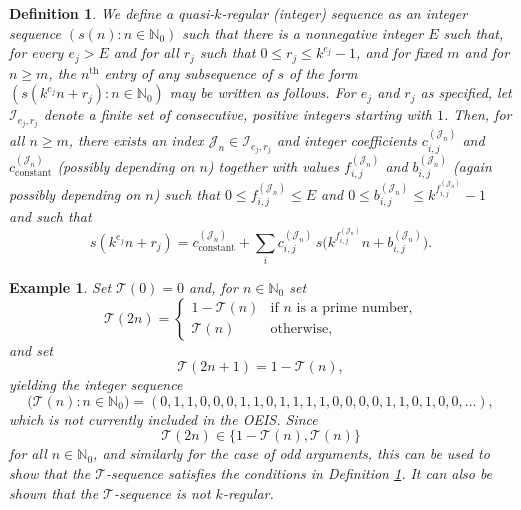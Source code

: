 \documentclass[12pt]{article}
\newtheorem{definition}{Definition}
\newtheorem{example}{Example}
\begin{document}
\begin{definition}\label{definitionquasi}
 We define a \emph{quasi-$k$-regular (integer) sequence}  as an integer sequence $(s(n) : n \in \mathbb{N}_{0} )$ such that there is a 
 nonnegative integer $E$ such that,  for every $e_j > E$ and for all $r_j$ such that $0 \leq r_j \leq k^{e_j} - 1$, and for fixed $m$ and 
 for $n \geq m$, the $n^{\text{th}}$ entry  of any subsequence of $s$ of the form $(s(k^{e_j} n + r_j ) : n \in \mathbb{N}_{0} )$ may be 
 written as follows. For $e_j$ and $r_j$ as specified,  let $\mathcal{I}_{e_j, r_j}$ denote a finite set of consecutive, positive integers 
 starting with $1$.  Then, for all $n \geq m$, there exists an index $\mathcal{J}_{n} \in \mathcal{I}_{e_j, r_j}$  and integer coefficients $c_{i, 
  j}^{\left( \mathcal{J}_{n} \right)}$ and  $c_{\text{constant}}^{\left( \mathcal{J}_{n} \right)}$ (possibly depending on $n$)  together with 
 values $f_{i, j}^{\left( \mathcal{J}_{n} \right)} $ and $ b_{i, j}^{\left( \mathcal{J}_{n}  \right)} $ (again possibly depending on $n$) such that 
 $0 \leq f_{i, j}^{\left( \mathcal{J}_{n} \right)} \leq E$ and $0 \leq b_{i, j}^{\left( \mathcal{J}_{n} \right)} \leq k^{f_{i, j}^{\left( \mathcal{J}_{n} 
 \right)}} - 1$ and such that 
\begin{equation*}
 s(k^{e_j} n + r_j ) = c_{\text{constant}}^{\left( \mathcal{J}_{n} \right)}
 + \sum_{i} c_{i, j}^{\left( \mathcal{J}_{n} \right) } \, s\big( k^{f_{i, j}^{\left( \mathcal{J}_{n} \right)}} n 
 + b_{i, j}^{\left( \mathcal{J}_{n} \right)} \big). 
\end{equation*}
\end{definition}

\begin{example}\label{exmathcalT}
 Set $\mathcal{T}(0) = 0$ and, for $n \in \mathbb{N}_{0}$ set 
\[ \mathcal{T}(2n) = \begin{cases} 
 1 - \mathcal{T}(n) & \text{if $n$ is a prime number,} \\
 \mathcal{T}(n) & \text{otherwise}, 
 \end{cases} \] 
 and set $$ \mathcal{T}(2n+1) = 1 - \mathcal{T}(n), $$ yielding the integer sequence $$ \big( \mathcal{T}(n) : n \in \mathbb{N}_{0} 
 \big) = (0, 1, 1, 0, 0, 0, 1, 1, 0, 1, 1, 1, 1, 0, 0, 0, 0, 1, 1, 0, 1, 0, 0, \ldots), $$ which is not currently included in the OEIS. Since 
\begin{equation}\label{mathcalevenin}
 \mathcal{T}(2n) \in \{ 1 - \mathcal{T}(n), \mathcal{T}(n) \} 
\end{equation}
 for all $n \in \mathbb{N}_{0}$, and similarly for the case of odd arguments, 
 this can be used to show that the $\mathcal{T}$-sequence satisfies 
 the conditions in Definition \ref{definitionquasi}. 
 It can also be shown that the $\mathcal{T}$-sequence is not $k$-regular. 
\end{example}
\end{document}
